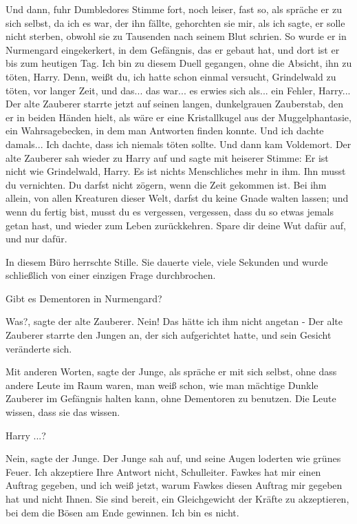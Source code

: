 \glqq{}Und dann\grqq{}, fuhr Dumbledores Stimme fort, noch leiser, fast so, als
spräche er zu sich selbst, \glqq{}da ich es war, der ihn fällte, gehorchten sie
mir, als ich sagte, er solle nicht sterben, obwohl sie zu Tausenden nach seinem
Blut schrien. So wurde er in Nurmengard eingekerkert, in dem Gefängnis, das er
gebaut hat, und dort ist er bis zum heutigen Tag. Ich bin zu diesem Duell
gegangen, ohne die Absicht, ihn zu töten, Harry. Denn, weißt du, ich hatte schon
einmal versucht, Grindelwald zu töten, vor langer Zeit, und das... das war... es
erwies sich als... ein Fehler, Harry...\grqq{} Der alte Zauberer starrte jetzt
auf seinen langen, dunkelgrauen Zauberstab, den er in beiden Händen hielt, als
wäre er eine Kristallkugel aus der Muggelphantasie, ein Wahrsagebecken, in dem
man Antworten finden konnte. \glqq{}Und ich dachte damals... Ich dachte, dass ich
niemals töten sollte. Und dann kam Voldemort.\grqq{} Der alte Zauberer sah
wieder zu Harry auf und sagte mit heiserer Stimme: \glqq{}Er ist nicht wie
Grindelwald, Harry. Es ist nichts Menschliches mehr in ihm. Ihn musst du
vernichten. Du darfst nicht zögern, wenn die Zeit gekommen ist. Bei ihm allein,
von allen Kreaturen dieser Welt, darfst du keine Gnade walten lassen; und wenn
du fertig bist, musst du es vergessen, vergessen, dass du so etwas jemals getan
hast, und wieder zum Leben zurückkehren. Spare dir deine Wut dafür auf, und nur
dafür.\grqq{}

In diesem Büro herrschte Stille. Sie dauerte viele, viele Sekunden und wurde
schließlich von einer einzigen Frage durchbrochen.

\glqq{}Gibt es Dementoren in Nurmengard?\grqq{}

\glqq{}Was?\grqq{}, sagte der alte Zauberer. \glqq{}Nein! Das hätte ich ihm nicht
angetan -\grqq{} Der alte Zauberer starrte den Jungen an, der sich aufgerichtet
hatte, und sein Gesicht veränderte sich.

\glqq{}Mit anderen Worten\grqq{}, sagte der Junge, als spräche er mit sich
selbst, ohne dass andere Leute im Raum waren, \glqq{}man weiß schon, wie man
mächtige Dunkle Zauberer im Gefängnis halten kann, ohne Dementoren zu benutzen.
Die Leute wissen, dass sie das wissen.\grqq{}

\glqq{}Harry ...?\grqq{}

\glqq{}Nein\grqq{}, sagte der Junge. Der Junge sah auf, und seine Augen loderten
wie grünes Feuer. \glqq{}Ich akzeptiere Ihre Antwort nicht, Schulleiter. Fawkes
hat mir einen Auftrag gegeben, und ich weiß jetzt, warum Fawkes diesen Auftrag
mir gegeben hat und nicht Ihnen. Sie sind bereit, ein Gleichgewicht der Kräfte
zu akzeptieren, bei dem die Bösen am Ende gewinnen. Ich bin es nicht.\grqq{}

